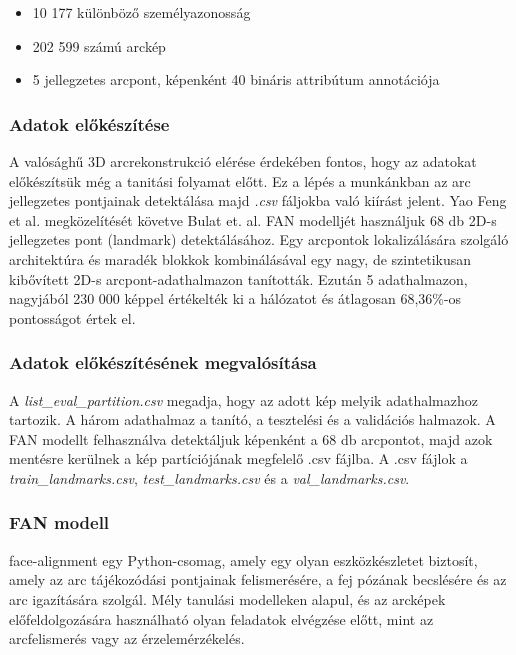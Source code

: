 \documentclass[12pt,a4]{article}
\begin{document}
    \begin{itemize}
        \item 10 177 különböző személyazonosság
        \item 202 599 számú arckép
        \item 5 jellegzetes arcpont, képenként 40 bináris attribútum annotációja
    \end{itemize}

	\subsubsection{Adatok előkészítése}

   A valósághű 3D arcrekonstrukció elérése érdekében fontos, hogy az adatokat előkészítsük még a tanitási folyamat előtt. Ez a lépés a munkánkban az arc jellegzetes pontjainak detektálása majd \textit{.csv} fáljokba való kiírást jelent. Yao Feng et al. \cite{deca} megközelítését követve Bulat et. al. \cite{bulat} FAN modelljét használjuk 68 db 2D-s jellegzetes pont (landmark) detektálásához. Egy arcpontok lokalizálására szolgáló architektúra és maradék blokkok kombinálásával egy nagy, de szintetikusan kibővített 2D-s arcpont-adathalmazon tanították. Ezután 5 adathalmazon, nagyjából 230 000 képpel értékelték ki a hálózatot és átlagosan 68,36\%-os pontosságot értek el.

   \subsubsection{Adatok előkészítésének megvalósítása}

   A \textit{list\_eval\_partition.csv} megadja, hogy az adott kép melyik adathalmazhoz tartozik.
   A három adathalmaz a tanító, a tesztelési és a validációs halmazok. A FAN modellt felhasználva detektáljuk képenként a 68 db arcpontot, majd azok mentésre kerülnek a kép partíciójának megfelelő .csv fájlba. A .csv fájlok a \textit{train\_landmarks.csv}, \textit{test\_landmarks.csv} és a \textit{val\_landmarks.csv}.
				
    \subsubsection{FAN modell}
    
     face-alignment egy Python-csomag, amely egy olyan eszközkészletet biztosít, amely az arc tájékozódási pontjainak felismerésére, a fej pózának becslésére és az arc igazítására szolgál. 
Mély tanulási modelleken alapul, és az arcképek előfeldolgozására használható olyan feladatok elvégzése előtt, mint az arcfelismerés vagy az érzelemérzékelés.
\end{document}
